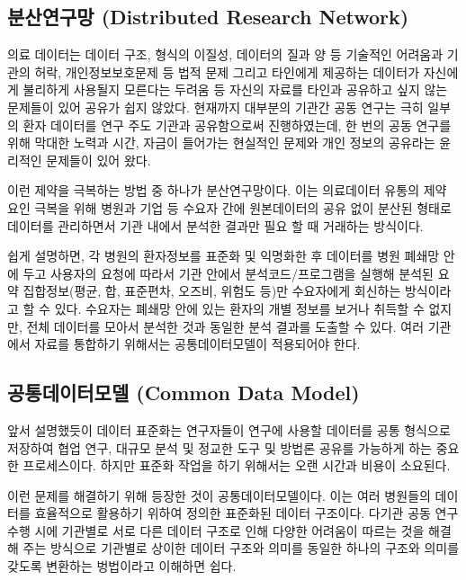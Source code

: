 \documentclass[]{book}
\begin{document}
\hypertarget{distributed-research-network}{%
\subsection{분산연구망 (Distributed Research Network)}\label{distributed-research-network}}

의료 데이터는 데이터 구조, 형식의 이질성, 데이터의 질과 양 등 기술적인 어려움과 기관의 허락, 개인정보보호문제 등 법적 문제 그리고 타인에게 제공하는 데이터가 자신에게 불리하게 사용될지 모른다는 두려움 등 자신의 자료를 타인과 공유하고 싶지 않는 문제들이 있어 공유가 쉽지 않았다. 현재까지 대부분의 기관간 공동 연구는 극히 일부의 환자 데이터를 연구 주도 기관과 공유함으로써 진행하였는데, 한 번의 공동 연구를 위해 막대한 노력과 시간, 자금이 들어가는 현실적인 문제와 개인 정보의 공유라는 윤리적인 문제들이 있어 왔다.

이런 제약을 극복하는 방법 중 하나가 분산연구망이다. 이는 의료데이터 유통의 제약 요인 극복을 위해 병원과 기업 등 수요자 간에 원본데이터의 공유 없이 분산된 형태로 데이터를 관리하면서 기관 내에서 분석한 결과만 필요 할 때 거래하는 방식이다.

쉽게 설명하면, 각 병원의 환자정보를 표준화 및 익명화한 후 데이터를 병원 폐쇄망 안에 두고 사용자의 요청에 따라서 기관 안에서 분석코드/프로그램을 실행해 분석된 요약 집합정보(평균, 합, 표준편차, 오즈비, 위험도 등)만 수요자에게 회신하는 방식이라고 할 수 있다. 수요자는 폐쇄망 안에 있는 환자의 개별 정보를 보거나 취득할 수 없지만, 전체 데이터를 모아서 분석한 것과 동일한 분석 결과를 도출할 수 있다. 여러 기관에서 자료를 통합하기 위해서는 공통데이터모델이 적용되어야 한다.

\hypertarget{common-data-model}{%
\subsection{공통데이터모델 (Common Data Model)}\label{common-data-model}}

앞서 설명했듯이 데이터 표준화는 연구자들이 연구에 사용할 데이터를 공통 형식으로 저장하여 협업 연구, 대규모 분석 및 정교한 도구 및 방법론 공유를 가능하게 하는 중요한 프로세스이다. 하지만 표준화 작업을 하기 위해서는 오랜 시간과 비용이 소요된다.

이런 문제를 해결하기 위해 등장한 것이 공통데이터모델이다. 이는 여러 병원들의 데이터를 효율적으로 활용하기 위하여 정의한 표준화된 데이터 구조이다. 다기관 공동 연구 수행 시에 기관별로 서로 다른 데이터 구조로 인해 다양한 어려움이 따르는 것을 해결해 주는 방식으로 기관별로 상이한 데이터 구조와 의미를 동일한 하나의 구조와 의미를 갖도록 변환하는 벙법이라고 이해하면 쉽다.
\end{document}

